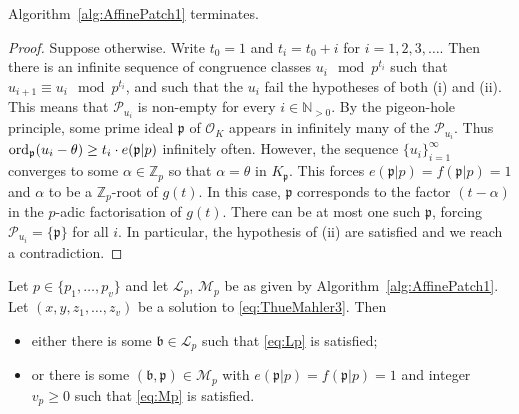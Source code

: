 \begin{lemma}
Algorithm~\ref{alg:AffinePatch1} terminates.
\end{lemma}

\begin{proof}
Suppose otherwise. Write $t_0=1$ and $t_i=t_0+i$ for $i=1,2,3,\dots$. Then there is an infinite sequence of congruence classes $u_i \mod{p^{t_i}}$ such that ${u_{i+1} \equiv u_i \mod{p^{t_i}}}$, and such that the $u_i$ fail the hypotheses of both (i) and (ii). This means that $\mathcal{P}_{u_i}$ is non-empty for every $i \in \mathbb{N}_{>0}$. By the pigeon-hole principle, some prime ideal $\mathfrak{p}$ of $\mathcal{O}_K$ appears in infinitely many of the $\mathcal{P}_{u_i}$. Thus ${\operatorname{ord}_{\mathfrak{p}}(u_i-\theta) \ge t_i\cdot e(\mathfrak{p}|p)}$ infinitely often. However, the sequence $\{u_i\}_{i=1}^{\infty}$ converges to some $\alpha \in \mathbb{Z}_p$ so that $\alpha=\theta$ in $K_\mathfrak{p}$. This forces $e(\mathfrak{p}|p)=f(\mathfrak{p}|p)=1$ and $\alpha$ to be a $\mathbb{Z}_p$-root of $g(t)$. In this case, $\mathfrak{p}$ corresponds to the factor $(t-\alpha)$ in the $p$-adic factorisation of $g(t)$. There can be at most one such $\mathfrak{p}$, forcing $\mathcal{P}_{u_i}=\{\mathfrak{p}\}$ for all $i$. In particular, the hypothesis of (ii) are satisfied and we reach a contradiction.
\end{proof}

\begin{lemma}\label{lem:AffinePatch1Check}
Let $p \in \{p_1, \dots, p_v\}$ and let $\mathcal{L}_p$, $\mathcal{M}_p$ be as given by Algorithm~\ref{alg:AffinePatch1}. Let $(x,y,z_1,\dots, z_v)$ be a solution to \eqref{eq:ThueMahler3}. Then
\begin{itemize}
\item either there is some $\mathfrak{b} \in \mathcal{L}_p$ such that \eqref{eq:Lp} is satisfied; 
\item or there is some $(\mathfrak{b},\mathfrak{p}) \in \mathcal{M}_p$ with $e(\mathfrak{p}|p)=f(\mathfrak{p}|p)=1$ and integer $v_p \geq 0$ such that \eqref{eq:Mp} is satisfied.
\end{itemize}
\end{lemma}

